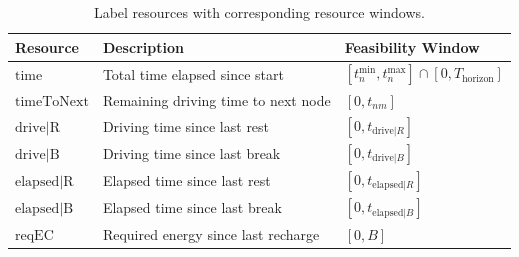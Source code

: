 \documentclass[3p,11pt,authoryear]{elsarticle}  %
\begin{document}
\begin{table}[!htbp]
\centering
\caption{Label resources with corresponding resource windows.}
\label{tab:resource_windows}
\begin{tabular}{@{}lll@{}}
\toprule
\textbf{Resource} & \textbf{Description} & \textbf{Feasibility Window} \\
\midrule
$ \text{time} $ & Total time elapsed since start & $ [t^{\min}_n, t^{\max}_n] \cap [0, T_{\text{horizon}}] $ \\
$ \text{timeToNext} $ & Remaining driving time to next node & $ [0, t_{nm}] $ \\
$ \text{drive|R} $ & Driving time since last rest & $ [0, t_{\text{drive}|R}] $ \\
$ \text{drive|B} $ & Driving time since last break & $ [0, t_{\text{drive}|B}] $ \\
$ \text{elapsed|R} $ & Elapsed time since last rest & $ [0, t_{\text{elapsed}|R}] $ \\
$ \text{elapsed|B} $ & Elapsed time since last break & $ [0, t_{\text{elapsed}|B}] $ \\
$ \text{reqEC} $ & Required energy since last recharge & $ [0, B] $ \\
\bottomrule
\end{tabular}
\end{table}
\end{document}
